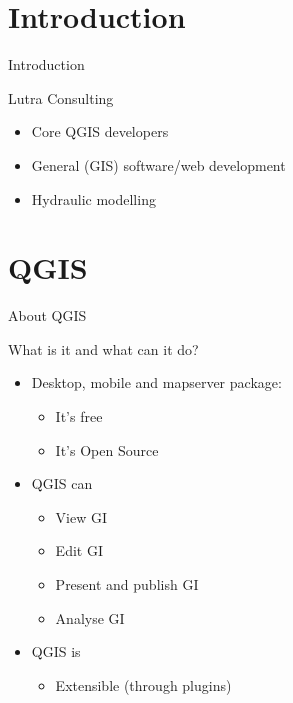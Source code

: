\section{Introduction}

\begin{frame}{Introduction}
	\begin{block}{Lutra Consulting}
		\begin{itemize}
			\item Core QGIS developers
			\item General (GIS) software/web development
			\item Hydraulic modelling
		\end{itemize}
	\end{block}
\end{frame}

\section{QGIS}
\begin{frame}{About QGIS}
\begin{block}{What is it and what can it do?}
	\begin{itemize}
		\item Desktop, mobile and mapserver package:
		\begin{itemize}
			\item It's free
			\item It's Open Source
		\end{itemize}	
		\item QGIS can
		\begin{itemize}
			\item View GI
			\item Edit GI
			\item Present and publish GI
			\item Analyse GI
		\end{itemize}
		\item QGIS is
		\begin{itemize}
			\item Extensible (through plugins)
		\end{itemize}
		
	\end{itemize}
\end{block}
\end{frame}

